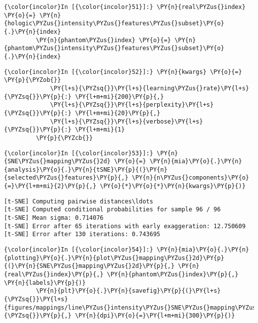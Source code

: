     \begin{Verbatim}[commandchars=\\\{\}]
{\color{incolor}In [{\color{incolor}51}]:} \PY{n}{real\PYZus{}index} \PY{o}{=} \PY{n}{hologic\PYZus{}intensity\PYZus{}features\PYZus{}subset}\PY{o}{.}\PY{n}{index}
         \PY{n}{phantom\PYZus{}index} \PY{o}{=} \PY{n}{phantom\PYZus{}intensity\PYZus{}features\PYZus{}subset}\PY{o}{.}\PY{n}{index}
\end{Verbatim}

    \begin{Verbatim}[commandchars=\\\{\}]
{\color{incolor}In [{\color{incolor}52}]:} \PY{n}{kwargs} \PY{o}{=} \PY{p}{\PYZob{}}
             \PY{l+s}{\PYZsq{}}\PY{l+s}{learning\PYZus{}rate}\PY{l+s}{\PYZsq{}}\PY{p}{:} \PY{l+m+mi}{200}\PY{p}{,}
             \PY{l+s}{\PYZsq{}}\PY{l+s}{perplexity}\PY{l+s}{\PYZsq{}}\PY{p}{:} \PY{l+m+mi}{20}\PY{p}{,}
             \PY{l+s}{\PYZsq{}}\PY{l+s}{verbose}\PY{l+s}{\PYZsq{}}\PY{p}{:} \PY{l+m+mi}{1}
         \PY{p}{\PYZcb{}}
\end{Verbatim}

    \begin{Verbatim}[commandchars=\\\{\}]
{\color{incolor}In [{\color{incolor}53}]:} \PY{n}{SNE\PYZus{}mapping\PYZus{}2d} \PY{o}{=} \PY{n}{mia}\PY{o}{.}\PY{n}{analysis}\PY{o}{.}\PY{n}{tSNE}\PY{p}{(}\PY{n}{selected\PYZus{}features}\PY{p}{,} \PY{n}{n\PYZus{}components}\PY{o}{=}\PY{l+m+mi}{2}\PY{p}{,} \PY{o}{*}\PY{o}{*}\PY{n}{kwargs}\PY{p}{)}
\end{Verbatim}

    \begin{Verbatim}[commandchars=\\\{\}]
[t-SNE] Computing pairwise distances\ldots
[t-SNE] Computed conditional probabilities for sample 96 / 96
[t-SNE] Mean sigma: 0.714076
[t-SNE] Error after 65 iterations with early exaggeration: 12.750609
[t-SNE] Error after 130 iterations: 0.743695
    \end{Verbatim}

    \begin{Verbatim}[commandchars=\\\{\}]
{\color{incolor}In [{\color{incolor}54}]:} \PY{n}{mia}\PY{o}{.}\PY{n}{plotting}\PY{o}{.}\PY{n}{plot\PYZus{}mapping\PYZus{}2d}\PY{p}{(}\PY{n}{SNE\PYZus{}mapping\PYZus{}2d}\PY{p}{,} \PY{n}{real\PYZus{}index}\PY{p}{,} \PY{n}{phantom\PYZus{}index}\PY{p}{,} \PY{n}{labels}\PY{p}{)}
         \PY{n}{plt}\PY{o}{.}\PY{n}{savefig}\PY{p}{(}\PY{l+s}{\PYZsq{}}\PY{l+s}{figures/mappings/line\PYZus{}intensity\PYZus{}SNE\PYZus{}mapping\PYZus{}2d.png}\PY{l+s}{\PYZsq{}}\PY{p}{,} \PY{n}{dpi}\PY{o}{=}\PY{l+m+mi}{300}\PY{p}{)}
\end{Verbatim}

